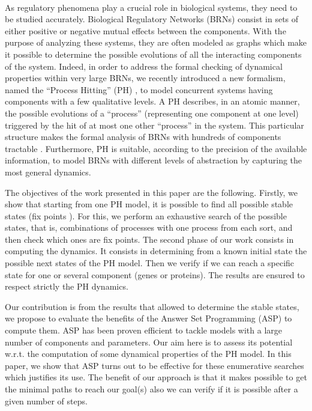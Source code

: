  \\
As regulatory phenomena play a crucial role in biological systems, they need to
be studied accurately. Biological Regulatory Networks (BRNs) consist in sets
of either positive or negative mutual effects between the components. With the
purpose of analyzing these systems, they are often modeled as graphs which make
it possible to determine the possible evolutions of all the interacting components of the system. Indeed, in order to address the formal checking of dynamical properties within very large BRNs, we recently introduced a new formalism, named the “Process Hitting” (PH) \cite{PMR10-TCSB}, to model concurrent systems having components with a few qualitative levels. A PH describes, in an atomic manner, the possible evolutions of a “process” (representing one component at one level) triggered by the hit of at most one other “process” in the system. This particular structure makes the formal analysis of BRNs with hundreds of components tractable . Furthermore, PH is suitable, according to the precision of the available information, to model BRNs with different levels of abstraction by capturing the most general dynamics.

The objectives of the work presented in this paper are the following.
Firstly, we show that starting from one PH model, it is possible to find all possible stable states (fix points \cite{wuensche1998genomic} ). 
For this, we perform an exhaustive search of the possible states, that is, combinations of processes with one process from each sort, and then check which ones are fix points.
The second phase of our work consists in computing the dynamics. It consists in determining from a known initial state the possible next states of the PH model. Then we verify if we can reach a specific state for one or several component (genes or proteins). The results are ensured to respect strictly the PH dynamics.

Our contribution is from the results that allowed to determine the stable states, we propose to evaluate the benefits of the Answer Set Programming (ASP) \cite{baral2003knowledge} to compute them. ASP has been proven efficient to tackle models with a large number of components and parameters. Our aim here is to assess its potential w.r.t. the computation of some dynamical properties of the PH model. In this paper, we show that ASP turns out to be effective for these enumerative searches which justifies its use. The benefit of our approach is that it makes possible to get the minimal paths to reach our goal(s) also we can verify if it is possible after a given number of steps. %

